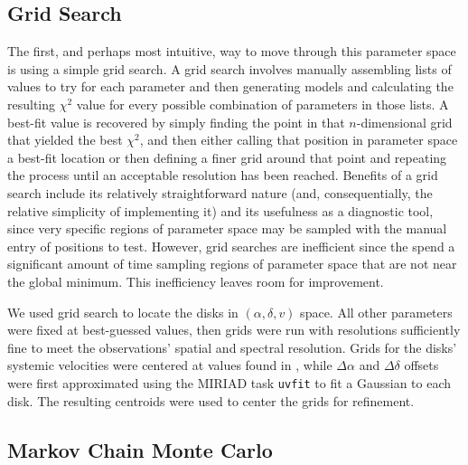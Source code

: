 \subsection{Grid Search}
\label{subsection:grid_search}
The first, and perhaps most intuitive, way to move through this parameter space is using a simple grid search. A grid search involves manually assembling lists of values to try for each parameter and then generating models and calculating the resulting $\chi^2$ value for every possible combination of parameters in those lists. A best-fit value is recovered by simply finding the point in that $n$-dimensional grid that yielded the best $\chi^2$, and then either calling that position in parameter space a best-fit location or then defining a finer grid around that point and repeating the process until an acceptable resolution has been reached. Benefits of a grid search include its relatively straightforward nature (and, consequentially, the relative simplicity of implementing it) and its usefulness as a diagnostic tool, since very specific regions of parameter space may be sampled with the manual entry of positions to test. However, grid searches are inefficient since the spend a significant amount of time sampling regions of parameter space that are not near the global minimum. This inefficiency leaves room for improvement.


We used grid search to locate the disks in $(\alpha, \delta, v)$ space. All other parameters were fixed at best-guessed values, then grids were run with resolutions sufficiently fine to meet the observations' spatial and spectral resolution. Grids for the disks' systemic velocities were centered at values found in \citet{Williams2014}, while $\Delta \alpha$ and $\Delta \delta$ offsets were first approximated using the \textsc{MIRIAD} task \texttt{uvfit} to fit a Gaussian to each disk. The resulting centroids were used to center the grids for refinement.


\subsection{Markov Chain Monte Carlo}
\label{subsection:mcmc}

